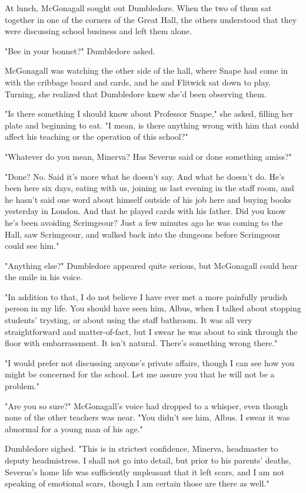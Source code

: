 At lunch, McGonagall sought out Dumbledore. When the two of them sat together in one of the corners of the Great Hall, the others understood that they were discussing school business and left them alone.

"Bee in your bonnet?" Dumbledore asked.

McGonagall was watching the other side of the hall, where Snape had come in with the cribbage board and cards, and he and Flitwick sat down to play. Turning, she realized that Dumbledore knew she'd been observing them.

"Is there something I should know about Professor Snape," she asked, filling her plate and beginning to eat. "I mean, is there anything wrong with him that could affect his teaching or the operation of this school?"

"Whatever do you mean, Minerva? Has Severus said or done something amiss?"

"Done? No. Said{\el} it's more what he doesn't say. And what he doesn't do. He's been here six days, eating with us, joining us last evening in the staff room, and he hasn't said one word about himself outside of his job here and buying books yesterday in London. And that he played cards with his father. Did you know he's been avoiding Scrimgeour? Just a few minutes ago he was coming to the Hall, saw Scrimgeour, and walked back into the dungeons before Scrimgeour could see him."

"Anything else?" Dumbledore appeared quite serious, but McGonagall could hear the smile in his voice.

"In addition to that, I do not believe I have ever met a more painfully prudish person in my life. You should have seen him, Albus, when I talked about stopping students' trysting, or about using the staff bathroom. It was all very straightforward and matter-of-fact, but I swear he was about to sink through the floor with embarrassment. It isn't natural. There's something wrong there."

"I would prefer not discussing anyone's private affairs, though I can see how you might be concerned for the school. Let me assure you that he will not be a problem."

"Are you so sure?" McGonagall's voice had dropped to a whisper, even though none of the other teachers was near. "You didn't see him, Albus. I swear it was abnormal for a young man of his age."

Dumbledore sighed. "This is in strictest confidence, Minerva, headmaster to deputy headmistress. I shall not go into detail, but prior to his parents' deaths, Severus's home life was sufficiently unpleasant that it left scars, and I am not speaking of emotional scars, though I am certain those are there as well."


